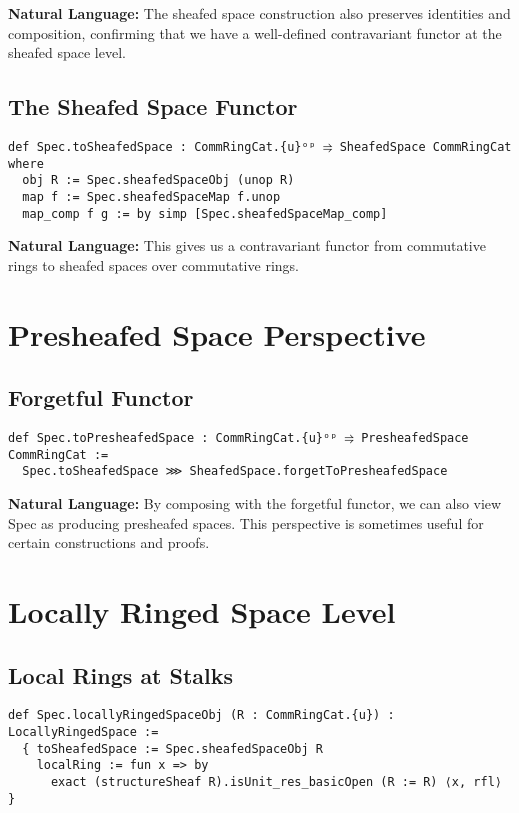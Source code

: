 \documentclass{article}
\theoremstyle{definition}
\begin{document}
\textbf{Natural Language:} The sheafed space construction also preserves identities and composition, confirming that we have a well-defined contravariant functor at the sheafed space level.

\subsection{The Sheafed Space Functor}

\begin{lstlisting}
def Spec.toSheafedSpace : CommRingCat.{u}ᵒᵖ ⥤ SheafedSpace CommRingCat where
  obj R := Spec.sheafedSpaceObj (unop R)
  map f := Spec.sheafedSpaceMap f.unop
  map_comp f g := by simp [Spec.sheafedSpaceMap_comp]
\end{lstlisting}

\textbf{Natural Language:} This gives us a contravariant functor from commutative rings to sheafed spaces over commutative rings.

\section{Presheafed Space Perspective}

\subsection{Forgetful Functor}

\begin{lstlisting}
def Spec.toPresheafedSpace : CommRingCat.{u}ᵒᵖ ⥤ PresheafedSpace CommRingCat :=
  Spec.toSheafedSpace ⋙ SheafedSpace.forgetToPresheafedSpace
\end{lstlisting}

\textbf{Natural Language:} By composing with the forgetful functor, we can also view Spec as producing presheafed spaces. This perspective is sometimes useful for certain constructions and proofs.

\section{Locally Ringed Space Level}

\subsection{Local Rings at Stalks}

\begin{lstlisting}
def Spec.locallyRingedSpaceObj (R : CommRingCat.{u}) : LocallyRingedSpace :=
  { toSheafedSpace := Spec.sheafedSpaceObj R
    localRing := fun x => by
      exact (structureSheaf R).isUnit_res_basicOpen (R := R) ⟨x, rfl⟩ }
\end{lstlisting}
\end{document}

